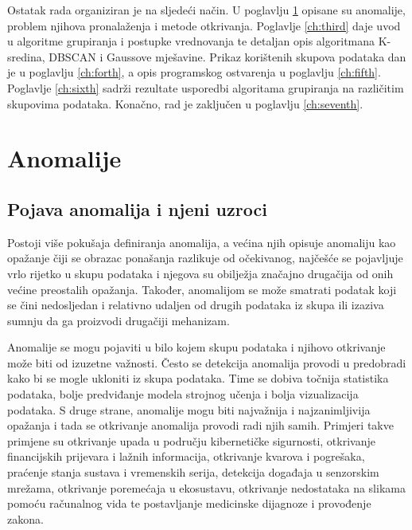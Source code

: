 \documentclass[utf8, diplomski, numeric]{fer}
\begin{document}
Ostatak rada organiziran je na sljedeći način. U poglavlju \ref{ch:second} opisane su anomalije, problem njihova pronalaženja i metode otkrivanja. Poglavlje \ref{ch:third} daje uvod u algoritme grupiranja i postupke vrednovanja te detaljan opis algoritmana K-sredina, DBSCAN i Gaussove mješavine. Prikaz korištenih skupova podataka dan je u poglavlju \ref{ch:forth}, a opis programskog ostvarenja u poglavlju \ref{ch:fifth}. Poglavlje \ref{ch:sixth} sadrži rezultate usporedbi algoritama grupiranja na različitim skupovima podataka. Konačno, rad je zaključen u poglavlju \ref{ch:seventh}.

\chapter{Anomalije} \label{ch:second}
\section{Pojava anomalija i njeni uzroci}
Postoji više pokušaja definiranja anomalija, a većina njih opisuje anomaliju kao opažanje čiji se obrazac ponašanja razlikuje od očekivanog, najčešće se pojavljuje vrlo rijetko u skupu podataka i njegova su obilježja značajno drugačija od onih većine preostalih opažanja. Također, anomalijom se može smatrati podatak koji se čini nedosljedan i relativno udaljen od drugih podataka iz skupa ili izaziva sumnju da ga proizvodi drugačiji mehanizam.

Anomalije se mogu pojaviti u bilo kojem skupu podataka i njihovo otkrivanje može biti od izuzetne važnosti. Često se detekcija anomalija provodi u predobradi kako bi se mogle ukloniti iz skupa podataka. Time se dobiva točnija statistika podataka, bolje predviđanje modela strojnog učenja i bolja vizualizacija podataka. S druge strane, anomalije mogu biti najvažnija i najzanimljivija opažanja i tada se otkrivanje anomalija provodi radi njih samih. Primjeri takve primjene su otkrivanje upada u području kibernetičke sigurnosti, otkrivanje financijskih prijevara i lažnih informacija, otkrivanje kvarova i pogrešaka, praćenje stanja sustava i vremenskih serija, detekcija događaja u senzorskim mrežama, otkrivanje poremećaja u ekosustavu, otkrivanje nedostataka na slikama pomoću računalnog vida te postavljanje medicinske dijagnoze i provođenje zakona.
\end{document}
